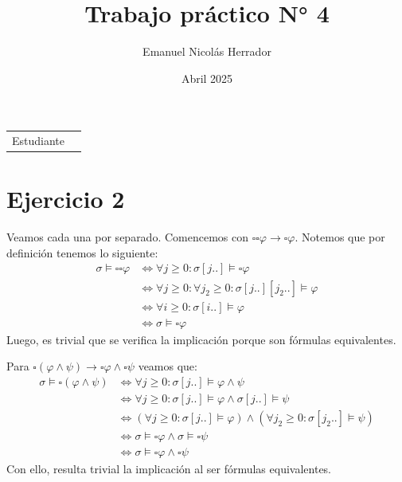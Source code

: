 \documentclass{article}
\title{Trabajo práctico N° 4}
\author{Emanuel Nicolás Herrador}
\date{Abril 2025}
\begin{document}
\maketitle

\noindent\begin{tabular}{@{}ll}
	Estudiante & \theauthor \\
\end{tabular}

\section*{Ejercicio 2}
Veamos cada una por separado.
Comencemos con $\square\square\varphi \to \square\varphi$.
Notemos que por definición tenemos lo siguiente:
\begin{equation*}
	\begin{aligned}
		\sigma \vDash \square\square\varphi & \iff \forall j \geq 0 : \sigma[j..] \vDash \square\varphi                      \\
		                                    & \iff \forall j \geq 0 : \forall j_2 \geq 0 : \sigma[j..][j_2..] \vDash \varphi \\
		                                    & \iff \forall i \geq 0 : \sigma[i..] \vDash \varphi                             \\
		                                    & \iff \sigma \vDash \square\varphi
	\end{aligned}
\end{equation*}
Luego, es trivial que se verifica la implicación porque son fórmulas equivalentes.

Para $\square(\varphi \land \psi) \to \square\varphi \land \square\psi$ veamos que:
\begin{equation*}
	\begin{aligned}
		\sigma \vDash \square(\varphi \land \psi) & \iff \forall j \geq 0 : \sigma[j..] \vDash \varphi \land \psi                                               \\
		                                          & \iff \forall j \geq 0 : \sigma[j..] \vDash \varphi \land \sigma[j..] \vDash \psi                            \\
		                                          & \iff (\forall j \geq 0 : \sigma[j..] \vDash \varphi) \land (\forall j_2 \geq 0 : \sigma[j_2..] \vDash \psi) \\
		                                          & \iff \sigma \vDash \square\varphi \land \sigma \vDash \square\psi                                           \\
		                                          & \iff \sigma \vDash \square\varphi \land \square\psi
	\end{aligned}
\end{equation*}
Con ello, resulta trivial la implicación al ser fórmulas equivalentes.
\end{document}
